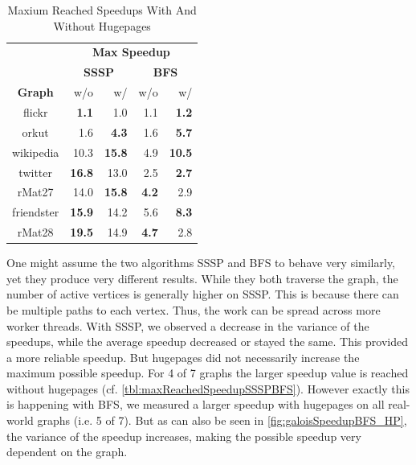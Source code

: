 \begin{table}
	\caption{Maxium Reached Speedups With And Without Hugepages}
	\label{tbl:maxReachedSpeedupSSSPBFS}
	\renewcommand{\arraystretch}{1.3}
	\centering
	\begin{tabular}{cr@{\tabskip 2 \tabcolsep}rr@{\tabskip 2 \tabcolsep}r}
		\toprule
		&\multicolumn{4}{c}{\bf Max Speedup}\\
		&\multicolumn{2}{c}{\bf SSSP}&\multicolumn{2}{c}{\bf BFS}\\
		\cmidrule{2-3}\cmidrule{4-5}
		\bf Graph & w/o & w/&w/o&w/\\
		\midrule
		flickr & \bf 1.1 &  1.0 & 1.1 & \bf 1.2 \\
		orkut & 1.6 & \bf 4.3 & 1.6 & \bf 5.7 \\
		wikipedia & 10.3 & \bf 15.8 & 4.9 & \bf 10.5 \\
		twitter & \bf 16.8 &  13.0 & 2.5 & \bf 2.7 \\
		rMat27 & 14.0 & \bf 15.8 & \bf 4.2 & 2.9 \\
		friendster & \bf 15.9 &  14.2 & 5.6 & \bf 8.3 \\
		rMat28 & \bf 19.5 &  14.9 & \bf 4.7 & 2.8 \\
		\bottomrule
	\end{tabular}
\end{table}
One might assume the two algorithms SSSP and BFS to behave very similarly, yet they produce very different results. While they both traverse the graph, the number of active vertices is generally higher on SSSP. This is because there can be multiple paths to each vertex. Thus, the work can be spread across more worker threads.
With SSSP, we observed a decrease in the variance of the speedups, while the average speedup decreased or stayed the same. This provided a more reliable speedup. 
But hugepages did not necessarily increase the maximum possible speedup. For 4 of 7 graphs the larger speedup value is reached without hugepages (cf. \autoref{tbl:maxReachedSpeedupSSSPBFS}).
However exactly this is happening with BFS, we measured a larger speedup with hugepages on all real-world graphs (i.e. 5 of 7).
But as can also be seen in \autoref{fig:galoisSpeedupBFS_HP}, the variance of the speedup increases, making the possible speedup very dependent on the graph.




